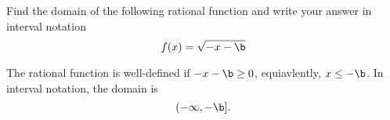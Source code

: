 






Find the domain of the following rational function and write your answer in interval notation
\[
  f(x)=\sqrt{-x-\b}
\]

\begin{solution}
The rational function is well-defined if $-x-\b\geq 0$, equiavlently, $x\leq -\b$. In interval notation, the domain is 
\[(-\infty, -\b].\]
\end{solution}